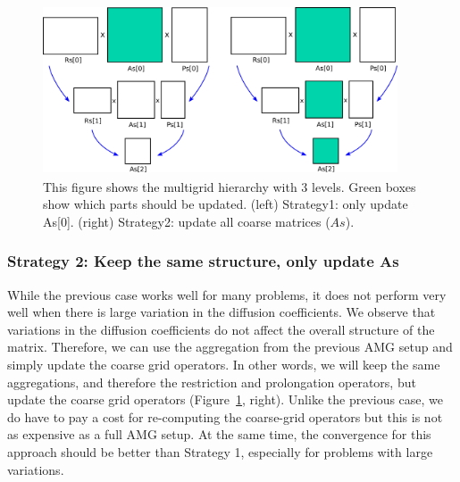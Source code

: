 \begin{figure}[ht]
 \centering
 \includegraphics[width=10.5cm,height=5cm]{./figures/strategy1and2.pdf}
 \caption{This figure shows the multigrid hierarchy with 3 levels. Green boxes show which parts should be updated.
          (left) Strategy1: only update As[0].
          (right) Strategy2: update all coarse matrices ($As$).}
 \label{fig:str1and2}
\end{figure}



\subsubsection{Strategy 2: Keep the same structure, only update As}

While the previous case works well for many problems, it does not perform very well when there
is large variation in the diffusion coefficients. We observe that variations in the diffusion
coefficients do not affect the overall structure of the matrix.
Therefore, we can use the aggregation from the previous AMG setup and simply update the coarse grid operators.
In other words, we will keep the same aggregations, and therefore the restriction and prolongation operators,
but update the coarse grid operators (Figure~\ref{fig:str1and2}, right). Unlike the previous case, we do have to pay a cost for
re-computing the coarse-grid operators but this is not as expensive as a full AMG setup.
At the same time, the convergence for this approach should be better than Strategy 1,
especially for problems with large variations. 

